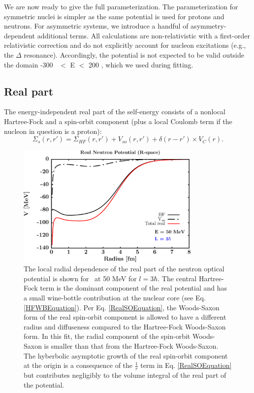 We are now ready to give the full parameterization. The parameterization for symmetric nuclei
is simpler as the same potential is used for protons and neutrons. For asymmetric systems, we
introduce a handful of asymmetry-dependent additional terms.
All calculations are non-relativistic
with a first-order relativistic correction and do not explicitly account for
nucleon excitations (e.g., the $\Delta$ resonance). Accordingly, the potential
is not expected to be valid outside
the domain -300 \mega\electronvolt\ $<$ E $<$ 200 \mega\electronvolt,
which we used during fitting.

\subsection{Real part}
The energy-independent real part of the self-energy consists of a nonlocal Hartree-Fock and
a spin-orbit component (plus a local Coulomb term if the nucleon in question is a proton):
\begin{equation}
    \Sigma_{s}(r,r') =
    \Sigma_{HF}(r,r')+V_{so}(r,r')+\delta(r-r')\times V_{C}(r).
\end{equation}
\begin{figure}[tb]
    \centering
    \includegraphics[width=0.8\textwidth]{figures/RealPotentialRSpace.png}
    \caption[Radial dependence of the real part of the potential]
    {
        The local radial dependence of the real part of the neutron optical potential is shown
        for \niEight\ at 50 MeV for $l=3\hbar$. The central Hartree-Fock term
        is the dominant component of the real potential and has a small
        wine-bottle contribution at the nuclear core (see Eq.
        \ref{HFWBEquation}). Per Eq. \ref{RealSOEquation}, the Woods-Saxon form
        of the real spin-orbit component is allowed to have a different radius
        and diffuseness compared to the Hartree-Fock Woods-Saxon form. In this
        fit, the radial component of the spin-orbit Woods-Saxon is smaller than
        that from the Hartree-Fock Woods-Saxon. The
        hyberbolic asymptotic growth of the real spin-orbit component at the
        origin is a consequence of the $\frac{1}{r}$ term in Eq. \ref{RealSOEquation}
        but contributes negligibly to the volume integral of the real part of the potential.
    }
    \label{RealRadialDependence}
\end{figure}
